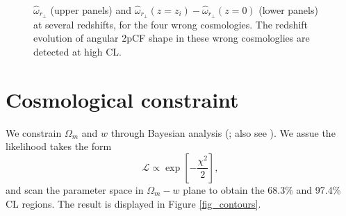 \documentclass[iop]{emulateapj}
\providecommand{\DIFadd}[1]{{\protect\color{blue}\uwave{#1}}} %
\providecommand{\DIFaddbegin}{} %
\providecommand{\DIFaddend}{} %
\begin{document}
\begin{figure}
   \caption{\label{fig_cosmo}
    $\hat{\omega}_{r_\perp}$ (upper panels) and $\hat{\omega}_{r_\perp}(z=z_i) - \hat{\omega}_{r_\perp}(z=0)$ (lower panels) at several redshifts,
    for the four wrong cosmologies.
    The redshift evolution of angular 2pCF shape in these wrong cosmologlies are detected at high CL.
   }
\end{figure}



\section{Cosmological constraint}



We constrain $\Omega_m$ and $w$ through \DIFaddbegin \DIFadd{a }\DIFaddend Bayesian analysis (\cite{Bayesian}; also see \cite{LB2002,Li2016}).
We assue the likelihood takes the form
\begin{equation}\label{eq:like}
 \mathcal{L} \propto \exp\left[-\frac{\chi^2}{2}\right],
\end{equation}
and scan the parameter space in $\Omega_m-w$ plane to obtain the 68.3\% and 97.4\% CL regions.
The result is displayed in Figure \ref{fig_contours}.
\end{document}
